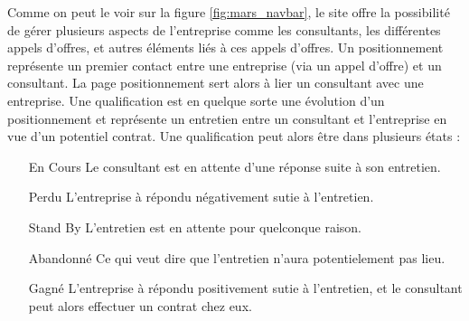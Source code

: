 Comme on peut le voir sur la figure \ref{fig:mars_navbar}, le site offre la possibilité de gérer plusieurs aspects
de l'entreprise comme les consultants, les différentes appels d'offres, et autres éléments liés à ces appels d'offres.
Un positionnement représente un premier contact entre une entreprise (via un appel d'offre) et un consultant. La page
positionnement sert alors à lier un consultant avec une entreprise. Une qualification est en quelque sorte une 
évolution d'un positionnement et représente un entretien entre un consultant et l'entreprise en vue d'un potentiel
contrat. Une qualification peut alors être dans plusieurs états :
\begin{itemize}
    \item [En Cours] Le consultant est en attente d'une réponse suite à son entretien.
    \item [Perdu] L'entreprise à répondu négativement sutie à l'entretien.
    \item [Stand By] L'entretien est en attente pour quelconque raison.
    \item [Abandonné] Ce qui veut dire que l'entretien n'aura potentielement pas lieu.
    \item [Gagné] L'entreprise à répondu positivement sutie à l'entretien, et le consultant peut alors effectuer un 
        contrat chez eux.
\end{itemize}
